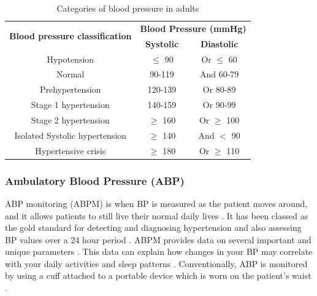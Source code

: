 \begin{table}[H]
    \centering
    \caption{Categories of blood pressure in adults \cite{Wang2018} \cite{Simjanoska20181}}
\begin{tabular}{|c|cc|}
\hline
\multirow{2}{*}{\textbf{Blood pressure classification}} & \multicolumn{2}{c|}{\textbf{Blood Pressure (mmHg)}} \\
 & \textbf{Systolic} & \textbf{Diastolic} \\ \hline
Hypotension & $\le$ 90 & Or $\le$ 60 \\
Normal & 90-119 & And 60-79 \\
Prehypertension & 120-139 & Or 80-89 \\
Stage 1 hypertension & 140-159 & Or 90-99 \\
Stage 2 hypertension & $\ge$ 160 & Or $\ge$ 100 \\ 
Isolated Systolic hypertension & $\ge$ 140 & And $<$ 90\\
Hypertensive crisis & $\ge$ 180 & Or $\ge$ 110 \\ \hline
\end{tabular}
\label{bp_vals_table}
\end{table}

\subsubsection{Ambulatory Blood Pressure (ABP)}
ABP monitoring (ABPM) is when BP is measured as the patient moves around, and it allows 
patients to still live their normal daily lives \cite{Huang2021}. It has been 
classed as the gold standard for detecting and diagnosing hypertension and 
also assessing BP values over a 24 hour period \cite{Kario2021}. ABPM provides 
data on several important and unique parameters \cite{Kario2021}. This data can
 explain how changes in your BP may correlate with your daily activities and sleep 
 patterns \cite{Huang2021}. Conventionally,  ABP is monitored by using a cuff 
 attached to a portable device which is worn on the patient's 
 waist \cite{Kario2021}.

